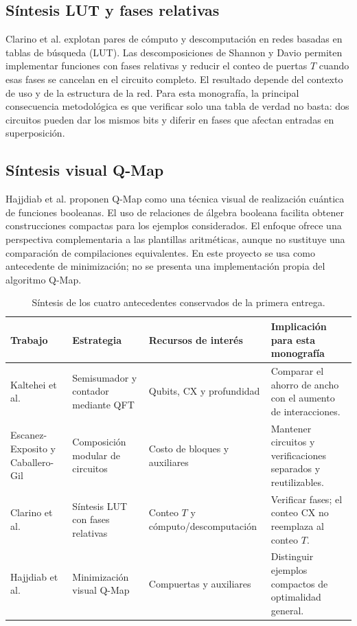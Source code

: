 \subsection{Síntesis LUT y fases relativas}
Clarino et al. \cite{clarino2025} explotan pares de cómputo y descomputación
en redes basadas en tablas de búsqueda (LUT). Las descomposiciones de Shannon
y Davio permiten implementar funciones con fases relativas y reducir el
conteo de puertas $T$ cuando esas fases se cancelan en el circuito completo.
El resultado depende del contexto de uso y de la estructura de la red.
Para esta monografía, la principal consecuencia metodológica es que verificar
solo una tabla de verdad no basta: dos circuitos pueden dar los mismos bits
y diferir en fases que afectan entradas en superposición.

\subsection{Síntesis visual Q-Map}
Hajjdiab et al. \cite{hajjdiab2024} proponen Q-Map como una técnica visual
de realización cuántica de funciones booleanas. El uso de relaciones de
álgebra booleana facilita obtener construcciones compactas para los ejemplos
considerados. El enfoque ofrece una perspectiva complementaria a las
plantillas aritméticas, aunque no sustituye una comparación de compilaciones
equivalentes. En este proyecto se usa como antecedente de minimización;
no se presenta una implementación propia del algoritmo Q-Map.

\begin{table}[t]
\centering\small
\caption{Síntesis de los cuatro antecedentes conservados de la primera entrega.}
\label{tab:literatura}
\renewcommand{\arraystretch}{1.12}
\begin{tabular}{@{}>{\raggedright\arraybackslash}p{2.5cm}>{\raggedright\arraybackslash}p{3.9cm}>{\raggedright\arraybackslash}p{3.9cm}>{\raggedright\arraybackslash}p{4.7cm}@{}}
\toprule
Trabajo & Estrategia & Recursos de interés & Implicación para esta monografía\\
\midrule
Kaltehei et al. \cite{kaltehei2026} & Semisumador y contador mediante QFT & Qubits, CX y profundidad & Comparar el ahorro de ancho con el aumento de interacciones.\\
Escanez-Exposito y Caballero-Gil \cite{escanez2026} & Composición modular de circuitos & Costo de bloques y auxiliares & Mantener circuitos y verificaciones separados y reutilizables.\\
Clarino et al. \cite{clarino2025} & Síntesis LUT con fases relativas & Conteo $T$ y cómputo/descomputación & Verificar fases; el conteo CX no reemplaza al conteo $T$.\\
Hajjdiab et al. \cite{hajjdiab2024} & Minimización visual Q-Map & Compuertas y auxiliares & Distinguir ejemplos compactos de optimalidad general.\\
\bottomrule
\end{tabular}
\end{table}

